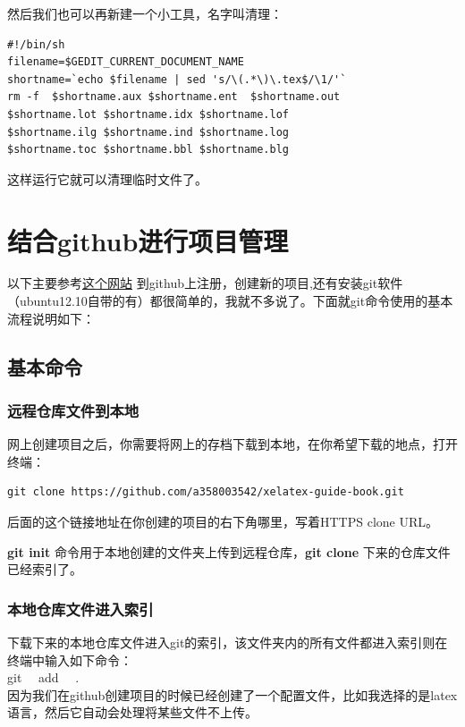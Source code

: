 \documentclass[12pt,oneside]{book}
\begin{document}
\begin{common-format}
然后我们也可以再新建一个小工具，名字叫清理：
\begin{Verbatim}
#!/bin/sh
filename=$GEDIT_CURRENT_DOCUMENT_NAME
shortname=`echo $filename | sed 's/\(.*\)\.tex$/\1/'`
rm -f  $shortname.aux $shortname.ent  $shortname.out 
$shortname.lot $shortname.idx $shortname.lof 
$shortname.ilg $shortname.ind $shortname.log 
$shortname.toc $shortname.bbl $shortname.blg
\end{Verbatim}
这样运行它就可以清理临时文件了。

\section{结合github进行项目管理}
以下主要参考\href{http://rogerdudler.github.io/git-guide/index.zh.html}{这个网站}
到github上注册，创建新的项目,还有安装git软件（ubuntu12.10自带的有）都很简单的，我就不多说了。下面就git命令使用的基本流程说明如下：
\subsection{基本命令}
\subsubsection{远程仓库文件到本地}
网上创建项目之后，你需要将网上的存档下载到本地，在你希望下载的地点，打开终端：
\begin{Verbatim}
git clone https://github.com/a358003542/xelatex-guide-book.git
\end{Verbatim}

后面的这个链接地址在你创建的项目的右下角哪里，写着HTTPS clone URL。

\textbf{git init }命令用于本地创建的文件夹上传到远程仓库，\textbf{git clone }下来的仓库文件已经索引了。

\subsubsection{本地仓库文件进入索引}
下载下来的本地仓库文件进入git的索引，该文件夹内的所有文件都进入索引则在终端中输入如下命令：\\
git ~~add ~~.  \\
因为我们在github创建项目的时候已经创建了一个配置文件，比如我选择的是latex语言，然后它自动会处理将某些文件不上传。


\end{common-format}
\end{document}
